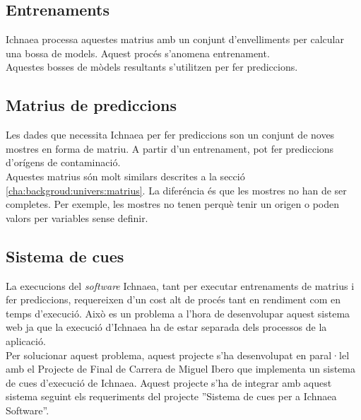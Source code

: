 \subsection{Entrenaments}
\label{subsec:backgroundTrainings}
Ichnaea processa aquestes matrius amb un conjunt d'envelliments per calcular una bossa de models. Aquest proc\'{e}s s'anomena entrenament. \\

Aquestes bosses de m\`{o}dels resultants s'utilitzen per fer prediccions.

\subsection{Matrius de prediccions}
Les dades que necessita Ichnaea per fer prediccions son un conjunt de noves mostres en forma de matriu. A partir d'un entrenament, pot fer prediccions d'orígens de contaminaci\'{o}.\\ 

Aquestes matrius s\'{o}n molt similars descrites a la secció \ref{cha:backgroud:univers:matrius}. La difer\'{e}ncia \'{e}s que les mostres no han de ser completes. Per exemple, les mostres no tenen perquè tenir un origen o poden valors per variables sense definir.

\subsection{Sistema de cues}
La execucions del \textit{software} Ichnaea, tant per executar entrenaments de matrius i fer prediccions, requereixen d'un cost alt de proc\'{e}s tant en rendiment com en temps d'execució. Això es un problema a l'hora de desenvolupar aquest sistema web ja que la execució d'Ichnaea ha de estar separada dels processos de la aplicació.\\

Per solucionar aquest problema, aquest projecte s'ha desenvolupat en paral·lel amb el Projecte de Final de Carrera de Miguel Ibero que implementa un sistema de cues d'execuci\'{o} de Ichnaea. Aquest projecte s'ha de integrar amb aquest sistema seguint els requeriments del projecte ''Sistema de cues per a Ichnaea Software''.